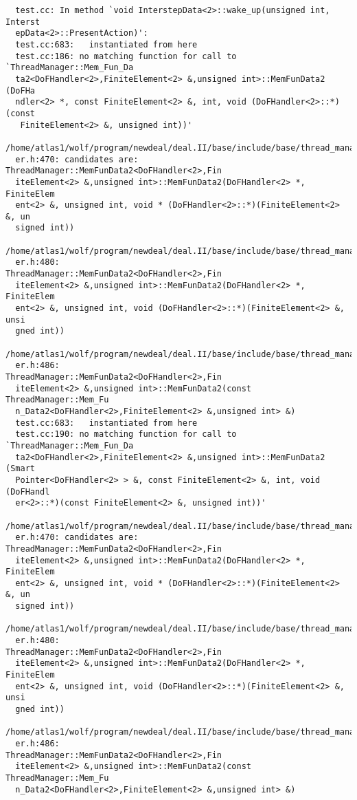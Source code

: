 \documentclass[11pt]{article}
\begin{document}
\begin{verbatim}
  test.cc: In method `void InterstepData<2>::wake_up(unsigned int, Interst
  epData<2>::PresentAction)':
  test.cc:683:   instantiated from here
  test.cc:186: no matching function for call to `ThreadManager::Mem_Fun_Da
  ta2<DoFHandler<2>,FiniteElement<2> &,unsigned int>::MemFunData2 (DoFHa
  ndler<2> *, const FiniteElement<2> &, int, void (DoFHandler<2>::*)(const
   FiniteElement<2> &, unsigned int))'
  /home/atlas1/wolf/program/newdeal/deal.II/base/include/base/thread_manag
  er.h:470: candidates are: ThreadManager::MemFunData2<DoFHandler<2>,Fin
  iteElement<2> &,unsigned int>::MemFunData2(DoFHandler<2> *, FiniteElem
  ent<2> &, unsigned int, void * (DoFHandler<2>::*)(FiniteElement<2> &, un
  signed int))
  /home/atlas1/wolf/program/newdeal/deal.II/base/include/base/thread_manag
  er.h:480:                 ThreadManager::MemFunData2<DoFHandler<2>,Fin
  iteElement<2> &,unsigned int>::MemFunData2(DoFHandler<2> *, FiniteElem
  ent<2> &, unsigned int, void (DoFHandler<2>::*)(FiniteElement<2> &, unsi
  gned int))
  /home/atlas1/wolf/program/newdeal/deal.II/base/include/base/thread_manag
  er.h:486:                 ThreadManager::MemFunData2<DoFHandler<2>,Fin
  iteElement<2> &,unsigned int>::MemFunData2(const ThreadManager::Mem_Fu
  n_Data2<DoFHandler<2>,FiniteElement<2> &,unsigned int> &)
  test.cc:683:   instantiated from here
  test.cc:190: no matching function for call to `ThreadManager::Mem_Fun_Da
  ta2<DoFHandler<2>,FiniteElement<2> &,unsigned int>::MemFunData2 (Smart
  Pointer<DoFHandler<2> > &, const FiniteElement<2> &, int, void (DoFHandl
  er<2>::*)(const FiniteElement<2> &, unsigned int))'
  /home/atlas1/wolf/program/newdeal/deal.II/base/include/base/thread_manag
  er.h:470: candidates are: ThreadManager::MemFunData2<DoFHandler<2>,Fin
  iteElement<2> &,unsigned int>::MemFunData2(DoFHandler<2> *, FiniteElem
  ent<2> &, unsigned int, void * (DoFHandler<2>::*)(FiniteElement<2> &, un
  signed int))
  /home/atlas1/wolf/program/newdeal/deal.II/base/include/base/thread_manag
  er.h:480:                 ThreadManager::MemFunData2<DoFHandler<2>,Fin
  iteElement<2> &,unsigned int>::MemFunData2(DoFHandler<2> *, FiniteElem
  ent<2> &, unsigned int, void (DoFHandler<2>::*)(FiniteElement<2> &, unsi
  gned int))
  /home/atlas1/wolf/program/newdeal/deal.II/base/include/base/thread_manag
  er.h:486:                 ThreadManager::MemFunData2<DoFHandler<2>,Fin
  iteElement<2> &,unsigned int>::MemFunData2(const ThreadManager::Mem_Fu
  n_Data2<DoFHandler<2>,FiniteElement<2> &,unsigned int> &)
\end{verbatim}
\end{document}
